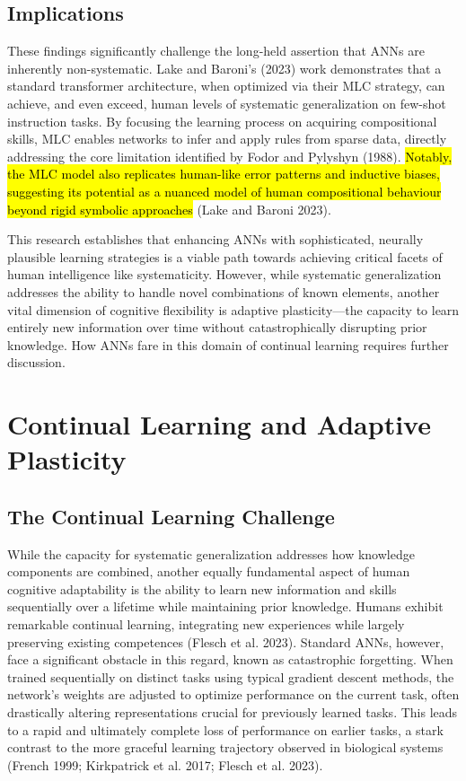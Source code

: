 \documentclass[
10pt, %
a4paper, %
oneside, %
headinclude,footinclude, %
BCOR5mm, %
]{scrartcl}
\begin{document}
\subsection{Implications}

These findings significantly challenge the long-held assertion that ANNs are inherently non-systematic. Lake and Baroni's (2023) work demonstrates that a standard transformer architecture, when optimized via their MLC strategy, can achieve, and even exceed, human levels of systematic generalization on few-shot instruction tasks. By focusing the learning process on acquiring compositional skills, MLC enables networks to infer and apply rules from sparse data, directly addressing the core limitation identified by Fodor and Pylyshyn (1988). \hl{Notably, the MLC model also replicates human-like error patterns and inductive biases, suggesting its potential as a nuanced model of human compositional behaviour beyond rigid symbolic approaches} (Lake and Baroni 2023). 

This research establishes that enhancing ANNs with sophisticated, neurally plausible learning strategies is a viable path towards achieving critical facets of human intelligence like systematicity. However, while systematic generalization addresses the ability to handle novel combinations of known elements, another vital dimension of cognitive flexibility is adaptive plasticity—the capacity to learn entirely new information over time without catastrophically disrupting prior knowledge. How ANNs fare in this domain of continual learning requires further discussion.



\section{Continual Learning and Adaptive Plasticity}

\subsection{The Continual Learning Challenge}

While the capacity for systematic generalization addresses how knowledge components are combined, another equally fundamental aspect of human cognitive adaptability is the ability to learn new information and skills sequentially over a lifetime while maintaining prior knowledge. Humans exhibit remarkable continual learning, integrating new experiences while largely preserving existing competences (Flesch et al. 2023). Standard ANNs, however, face a significant obstacle in this regard, known as catastrophic forgetting. When trained sequentially on distinct tasks using typical gradient descent methods, the network's weights are adjusted to optimize performance on the current task, often drastically altering representations crucial for previously learned tasks. This leads to a rapid and ultimately complete loss of performance on earlier tasks, a stark contrast to the more graceful learning trajectory observed in biological systems (French 1999; Kirkpatrick et al. 2017; Flesch et al. 2023). 
\end{document}
